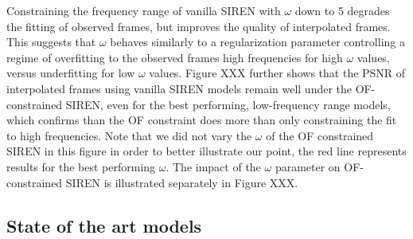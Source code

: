\documentclass{article}
\begin{document}
Constraining the frequency range of vanilla SIREN with $\omega$ down to 5 degrades the fitting of observed frames,
but improves the quality of interpolated frames.
This suggests that $\omega$ behaves similarly to a regularization parameter
controlling a regime of overfitting to the observed frames high frequencies for high $\omega$ values,
versus underfitting for low $\omega$ values.
Figure XXX further shows that the PSNR of interpolated frames using vanilla SIREN models remain well under the OF-constrained SIREN,
even for the best performing, low-frequency range models,
which confirms than the OF constraint does more than only constraining the fit to high frequencies.
Note that we did not vary the $\omega$ of the OF constrained SIREN in this figure in order to better illustrate our point,
the red line represents results for the best performing $\omega$.
The impact of the $\omega$ parameter on OF-constrained SIREN is illustrated separately in Figure XXX.

\subsection{State of the art models}
\label{sec_sota}
\end{document}
